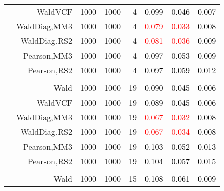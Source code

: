 \documentclass[
]{article}
\begin{document}
\begin{table}[H]
{\begin{tabular}[t]{lrrrrrrr}
\hspace{1em} & WaldVCF & 1000 & 1000 & 4 & \textcolor{black}{0.099} & \textcolor{black}{0.046} & \textcolor{black}{0.007}\\

\hspace{1em} & WaldDiag,MM3 & 1000 & 1000 & 4 & \textcolor{red}{0.079} & \textcolor{red}{0.033} & \textcolor{black}{0.008}\\

\hspace{1em} & WaldDiag,RS2 & 1000 & 1000 & 4 & \textcolor{red}{0.081} & \textcolor{red}{0.036} & \textcolor{black}{0.009}\\

\hspace{1em} & Pearson,MM3 & 1000 & 1000 & 4 & \textcolor{black}{0.097} & \textcolor{black}{0.053} & \textcolor{black}{0.009}\\

\hspace{1em} & Pearson,RS2 & 1000 & 1000 & 4 & \textcolor{black}{0.097} & \textcolor{black}{0.059} & \textcolor{black}{0.012}\\
\cmidrule{1-8}
\addlinespace[0.3em]
\multicolumn{8}{l}{\textbf{1F 15V}}\\
\hspace{1em} & Wald & 1000 & 1000 & 19 & \textcolor{black}{0.090} & \textcolor{black}{0.045} & \textcolor{black}{0.006}\\

\hspace{1em} & WaldVCF & 1000 & 1000 & 19 & \textcolor{black}{0.089} & \textcolor{black}{0.045} & \textcolor{black}{0.006}\\

\hspace{1em} & WaldDiag,MM3 & 1000 & 1000 & 19 & \textcolor{red}{0.067} & \textcolor{red}{0.032} & \textcolor{black}{0.008}\\

\hspace{1em} & WaldDiag,RS2 & 1000 & 1000 & 19 & \textcolor{red}{0.067} & \textcolor{red}{0.034} & \textcolor{black}{0.008}\\

\hspace{1em} & Pearson,MM3 & 1000 & 1000 & 19 & \textcolor{black}{0.103} & \textcolor{black}{0.052} & \textcolor{black}{0.013}\\

\hspace{1em} & Pearson,RS2 & 1000 & 1000 & 19 & \textcolor{black}{0.104} & \textcolor{black}{0.057} & \textcolor{black}{0.015}\\
\cmidrule{1-8}
\addlinespace[0.3em]
\multicolumn{8}{l}{\textbf{2F 10V}}\\
\hspace{1em} & Wald & 1000 & 1000 & 15 & \textcolor{black}{0.108} & \textcolor{black}{0.061} & \textcolor{black}{0.009}\\


\end{tabular}}
\end{table}
\end{document}
